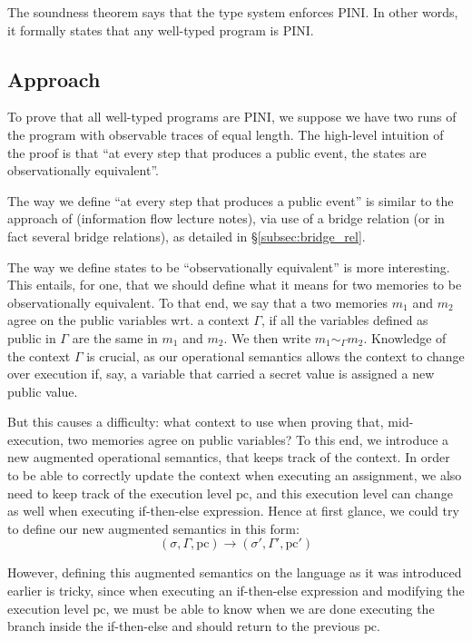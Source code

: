 \documentclass[10pt]{article}
\newcommand{\pc}{\mathrm{pc}}
\newcommand{\ctx}{\Gamma}
\newcommand{\agree}[3]{#2 \sim_{#1} #3}
\begin{document}
The soundness theorem says that the type system enforces PINI. In other words, it formally states
that any well-typed program is PINI. 

\subsection{Approach}%
\label{subsec:approach}

To prove that all well-typed programs are PINI, we suppose we have two runs of the program with observable traces of equal length. The high-level intuition of the proof is that ``at every step that produces a public event, the states are observationally equivalent''.

The way we define ``at every step that produces a public event'' is similar to the approach of (information flow lecture notes), via use of a bridge relation (or in fact several bridge relations), as detailed in \S\ref{subsec:bridge_rel}.

The way we define states to be ``observationally equivalent'' is more interesting. This entails, for one, that we should define what it means for two memories to be observationally equivalent. To that end, 
we say that a two memories $m_{1}$ and $m_{2}$ agree on the public variables wrt. a context $\ctx$,
if all the variables defined as public in $\ctx$ are the same in $m_{1}$ and $m_{2}$. We then write
$\agree{\ctx}{m_{1}}{m_{2}}$. Knowledge of the context \( \ctx \) is crucial, as our operational semantics allows the context to change over execution if, say, a variable that carried a secret value is assigned a new public value.

But this causes a difficulty: what context to use when proving that, mid-execution, two memories agree on public variables? To this end, we introduce a new augmented operational semantics, that keeps track of the context. In order to be able to correctly update the context when executing an assignment, we also need to keep track of the execution level \( \pc \), and this execution level can change as well when executing if-then-else expression. Hence at first glance, we could try to define our new augmented semantics in this form:
\[ (\sigma, \ctx, \pc) \to (\sigma', \ctx', \pc') \]

However, defining this augmented semantics on the language as it was introduced earlier is tricky, since when executing an if-then-else expression and modifying the execution level \( \pc \), we must be able to know when we are done executing the branch inside the if-then-else and should return to the previous \( \pc \).
\end{document}
